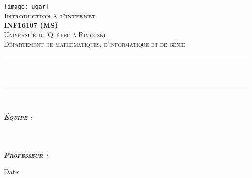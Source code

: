 \begin{titlepage}

\newcommand{\HRule}{\rule{\linewidth}{0.5mm}} %





\begin{center} %


\texttt{[image: uqar]}\\[1.5cm] 
\textbf{\textsc{\Large Introduction à l'internet \\ \vspace{0.5cm} INF16107 (MS)}}\\[1.0cm] 
\textsc{\Large Université du Québec à Rimouski}\\[0.5cm] 
\textsc{\large Département de mathématiques, d'informatique et de génie}\\[0.95cm] 


\HRule \\ %
{ \huge \bfseries \reporttitle}\\ %
\HRule \\[1.5cm]
\end{center}

\begin{flushleft} \large
\textit{\textsc{\textbf{Équipe :}}}\\
\reportauthorOne \\ %
\reportauthorTwo \\
\reportauthorThree \\
\vspace{0.5cm}
\textit{\textsc{\textbf{Professeur :}}}\\
\reportProfessor
\end{flushleft}
\vfill
\makeatletter
Date: \@date 




\makeatother


\end{titlepage}

